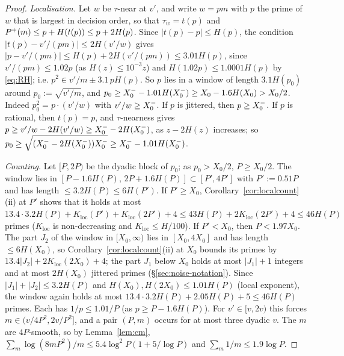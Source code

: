 \begin{proof}
\emph{Localisation.} Let $w$ be $\tau$-near at $v'$, and write $w=pm$ with $p$ the prime of $w$ that is largest in decision
order, so that $\tau_w=t(p)$ and $P^{+}(m)\le p+H(t(p))\le p+2H(p)$. Since $|t(p)-p|\le H(p)$, the condition $|t(p)-v'/(pm)|\le2H(v'/w)$
gives $|p-v'/(pm)|\le H(p)+2H(v'/(pm))\le3.01H(p)$, since $v'/(pm)\le1.02p$ (as $H(z)\le10^{-3}z$) and $H(1.02p)\le1.0001H(p)$ by \eqref{eq:RH};
i.e. $p^2\in v'/m\pm3.1\,pH(p)$. So $p$ lies in a window of length $3.1H(p_0)$
around $p_0:=\sqrt{v'/m}$, and $p_0\ge X_0^{-}-1.01H(X_0^{-})\ge X_0-1.6H(X_0)>X_0/2$.
Indeed $p_0^2=p\cdot(v'/w)$ with $v'/w\ge X_0^{-}$. If $p$ is jittered, then $p\ge X_0^{-}$. If $p$ is rational, then $t(p)=p$, and
$\tau$-nearness gives $p\ge v'/w-2H(v'/w)\ge X_0^{-}-2H(X_0^{-})$, as $z-2H(z)$ increases; so $p_0\ge\sqrt{(X_0^{-}-2H(X_0^{-}))X_0^{-}}\ge X_0^{-}-1.01H(X_0^{-})$.

\emph{Counting.} Let $[P,2P)$ be the dyadic block of $p_0$; as $p_0>X_0/2$, $P\ge X_0/2$. The window lies in $[P-1.6H(P),\,2P+1.6H(P)]\subset[P',4P']$ with $P':=0.51P$ and has length
$\le3.2H(P)\le6H(P')$.
If $P'\ge X_0$, Corollary~\ref{cor:localcount}(ii) at $P'$ shows that it holds at most
$13.4\cdot3.2H(P)+K_{\mathrm{loc}}(P')+K_{\mathrm{loc}}(2P')+4\le43H(P)+2K_{\mathrm{loc}}(2P')+4\le46H(P)$ primes
($K_{\mathrm{loc}}$ is non-decreasing and $K_{\mathrm{loc}}\le H/100$). If $P'<X_0$, then $P<1.97X_0$. The part $J_2$ of the
window in $[X_0,\infty)$ lies in $[X_0,4X_0]$ and has length $\le6H(X_0)$, so Corollary~\ref{cor:localcount}(ii) at $X_0$
bounds its primes by $13.4|J_2|+2K_{\mathrm{loc}}(2X_0)+4$; the part $J_1$ below $X_0$ holds at most $|J_1|+1$ integers and
at most $2H(X_0)$ jittered primes (\S\ref{sec:noise-notation}). Since $|J_1|+|J_2|\le3.2H(P)$ and
$H(X_0),H(2X_0)\le1.01H(P)$ (local exponent), the window again holds at most $13.4\cdot3.2H(P)+2.05H(P)+5\le46H(P)$ primes.
Each has $1/p\le1.01/P$ (as $p\ge P-1.6H(P)$). For $v'\in[v,2v)$ this forces $m\in(v/4P^2,2v/P^2]$, and a
pair $(P,m)$ occurs for at most three dyadic $v$. The $m$ are $4P$-smooth, so by Lemma~\ref{lem:cm},
$\sum_m\log(8mP^2)/m\le5.4\log^2P(1+5/\log P)$ and $\sum_m1/m\le1.9\log P$.


\end{proof}
